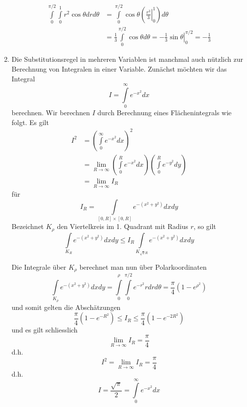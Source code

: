 \begin{enumerate}
\begin{align*}
\int\limits_0^{\pi /2} {\int\limits_0^1 {{r^2}\cos \theta drd\theta } }  &=\int\limits_0^{\pi /2} {\cos \theta \left( {\left. {\frac{{{r^3}}}{3}} \right|_0^1} \right)d\theta } \\
 &=\frac{1}{3}\int\limits_0^{\pi /2} {\cos \theta d\theta }  = \left. { - \frac{1}{3}\sin \theta } \right|_0^{\pi /2} =  - \frac{1}{3}
\end{align*}
\item Die Substitutionsregel in mehreren Variablen ist manchmal auch nützlich zur Berechnung von Integralen in einer Variable. Zunächst möchten wir das Integral \[ I=\int\limits_0^\infty e^{-x^2} dx\] berechnen. Wir berechnen $I$ durch Berechnung eines Flächenintegrals wie folgt. Es gilt
\begin{align*}
{I^2} &={\left( {\int\limits_0^\infty  {{e^{ - {x^2}}}dx} } \right)^2}\\
 &=\mathop {\lim }\limits_{R \to \infty } \left( {\int\limits_0^R {{e^{ - {x^2}}}dx} } \right)\left( {\int\limits_0^R {{e^{ - {y^2}}}dy} } \right)\\
 &=\mathop {\lim }\limits_{R \to \infty } {I_R}
\end{align*}
für \[{I_R} = \int\limits_{\left[ {0,R} \right] \times \left[ {0,R} \right]} {{e^{ - \left( {{x^2} + {y^2}} \right)}}dxdy} \]
Bezeichnet $K_\rho$ den Viertelkreis im 1. Quadrant mit Radius $r$, so gilt
\[\int\limits_{{K_R}} {{e^{ - \left( {{x^2} + {y^2}} \right)}}dxdy \le {I_R}\int\limits_{{K_{\sqrt 2 R}}} {{e^{ - \left( {{x^2} + {y^2}} \right)}}dxdy} } \]

\begin{center}
\end{center}

Die Integrale über $K_\rho$ berechnet man nun über Polarkoordinaten
\[\int\limits_{{K_\rho }} {{e^{ - \left( {{x^2} + {y^2}} \right)}}dxdy}  = \int\limits_0^\rho  {\int\limits_0^{\pi /2} {{e^{ - {r^2}}}rdrd\theta } }  = \frac{\pi }{4}\left( {1 - {e^{{\rho ^2}}}} \right)\]
und somit gelten die Abschätzungen
\[\frac{\pi }{4}\left( {1 - {e^{ - {R^2}}}} \right) \le {I_R} \le \frac{\pi }{4}\left( {1 - {e^{ - 2{R^2}}}} \right)\]
und es gilt schliesslich
\[\mathop {\lim }\limits_{R \to \infty } {I_R} = \frac{\pi }{4}\]
d.h. \[{I^2} = \mathop {\lim }\limits_{R \to \infty } {I_R} = \frac{\pi }{4}\]
d.h. \[I = \frac{{\sqrt \pi  }}{2} = \int\limits_0^\infty  {{e^{ - {x^2}}}dx} \]
\end{enumerate}

